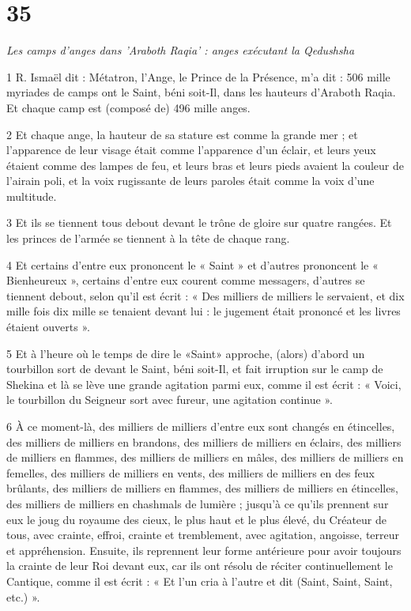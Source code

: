 \chapter{35}

\par \textit{Les camps d'anges dans 'Araboth Raqia' : anges exécutant la Qedushsha}

\par 1 R. Ismaël dit : Métatron, l'Ange, le Prince de la Présence, m'a dit : 506 mille myriades de camps ont le Saint, béni soit-Il, dans les hauteurs d'Araboth Raqia. Et chaque camp est (composé de) 496 mille anges.

\par 2 Et chaque ange, la hauteur de sa stature est comme la grande mer ; et l'apparence de leur visage était comme l'apparence d'un éclair, et leurs yeux étaient comme des lampes de feu, et leurs bras et leurs pieds avaient la couleur de l'airain poli, et la voix rugissante de leurs paroles était comme la voix d'une multitude.

\par 3 Et ils se tiennent tous debout devant le trône de gloire sur quatre rangées. Et les princes de l'armée se tiennent à la tête de chaque rang.

\par 4 Et certains d'entre eux prononcent le « Saint » et d'autres prononcent le « Bienheureux », certains d'entre eux courent comme messagers, d'autres se tiennent debout, selon qu'il est écrit : « Des milliers de milliers le servaient, et dix mille fois dix mille se tenaient devant lui : le jugement était prononcé et les livres étaient ouverts ».

\par 5 Et à l'heure où le temps de dire le «Saint» approche, (alors) d'abord un tourbillon sort de devant le Saint, béni soit-Il, et fait irruption sur le camp de Shekina et là se lève une grande agitation parmi eux, comme il est écrit : « Voici, le tourbillon du Seigneur sort avec fureur, une agitation continue ».

\par 6 À ce moment-là, des milliers de milliers d'entre eux sont changés en étincelles, des milliers de milliers en brandons, des milliers de milliers en éclairs, des milliers de milliers en flammes, des milliers de milliers en mâles, des milliers de milliers en femelles, des milliers de milliers en vents, des milliers de milliers en des feux brûlants, des milliers de milliers en flammes, des milliers de milliers en étincelles, des milliers de milliers en chashmals de lumière ; jusqu'à ce qu'ils prennent sur eux le joug du royaume des cieux, le plus haut et le plus élevé, du Créateur de tous, avec crainte, effroi, crainte et tremblement, avec agitation, angoisse, terreur et appréhension. Ensuite, ils reprennent leur forme antérieure pour avoir toujours la crainte de leur Roi devant eux, car ils ont résolu de réciter continuellement le Cantique, comme il est écrit : « Et l’un cria à l’autre et dit (Saint, Saint, Saint, etc.) ».


